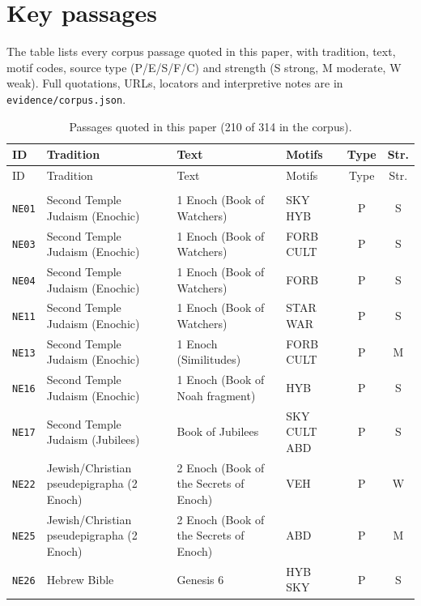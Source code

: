 \documentclass[11pt,a4paper]{article}
\begin{document}
\section{Key passages}\label{app:passages}
The table lists every corpus passage quoted in this paper, with tradition, text, motif codes, source type (P/E/S/F/C) and strength (S strong, M moderate, W weak). Full quotations, URLs, locators and interpretive notes are in \texttt{evidence/corpus.json}.

\scriptsize
\setlength{\tabcolsep}{2.5pt}
\renewcommand{\arraystretch}{0.95}
\begin{longtable}{@{}p{1.6cm}p{3.6cm}p{6.9cm}p{2.1cm}cc@{}}
\caption{Passages quoted in this paper (210 of 314 in the corpus).}\label{tab:passages}\\
\toprule ID & Tradition & Text & Motifs & Type & Str. \\ \midrule \endfirsthead
\toprule ID & Tradition & Text & Motifs & Type & Str. \\ \midrule \endhead
\bottomrule \endfoot
\multicolumn{6}{@{}l}{\textbf{Near East \& Abrahamic}} \\[2pt]
\texttt{NE01} & Second Temple Judaism (Enochic) & 1 Enoch (Book of Watchers) & SKY HYB & P & S \\
\texttt{NE03} & Second Temple Judaism (Enochic) & 1 Enoch (Book of Watchers) & FORB CULT & P & S \\
\texttt{NE04} & Second Temple Judaism (Enochic) & 1 Enoch (Book of Watchers) & FORB & P & S \\
\texttt{NE11} & Second Temple Judaism (Enochic) & 1 Enoch (Book of Watchers) & STAR WAR & P & S \\
\texttt{NE13} & Second Temple Judaism (Enochic) & 1 Enoch (Similitudes) & FORB CULT & P & M \\
\texttt{NE16} & Second Temple Judaism (Enochic) & 1 Enoch (Book of Noah fragment) & HYB & P & S \\
\texttt{NE17} & Second Temple Judaism (Jubilees) & Book of Jubilees & SKY CULT ABD & P & S \\
\texttt{NE22} & Jewish/Christian pseudepigrapha (2 Enoch) & 2 Enoch (Book of the Secrets of Enoch) & VEH & P & W \\
\texttt{NE25} & Jewish/Christian pseudepigrapha (2 Enoch) & 2 Enoch (Book of the Secrets of Enoch) & ABD & P & M \\
\texttt{NE26} & Hebrew Bible & Genesis 6 & HYB SKY & P & S \\

\end{longtable}
\end{document}
